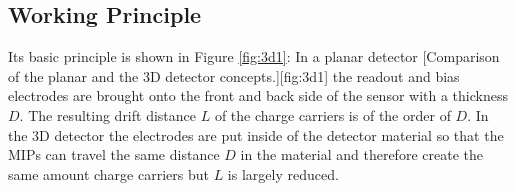 \subsection{Working Principle}
Its basic principle is shown in Figure \vref{fig:3d1}: In a planar detector 
[Comparison of the planar and the 3D detector concepts.][fig:3d1]
the readout and bias electrodes are brought onto the front and back side of the sensor with a thickness $D$. The resulting drift distance $L$ of the charge carriers is of the order of $D$. In the 3D detector the electrodes are put inside of the detector material so that the \acp{MIP} can travel the same distance $D$ in the material and therefore create the same amount charge carriers but $L$ is largely reduced.
